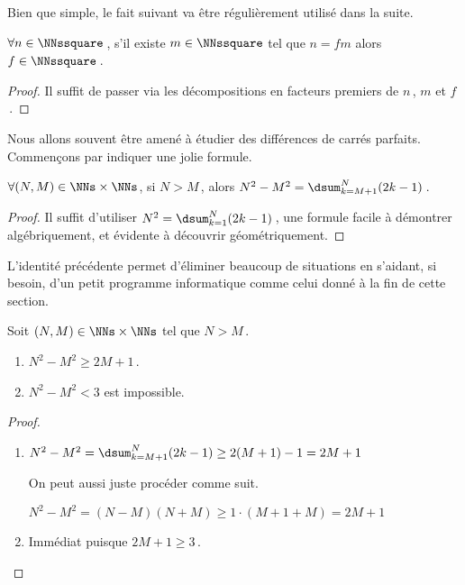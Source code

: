 

Bien que simple, le fait suivant va être régulièrement utilisé dans la suite.


\begin{fact} \label{facto-square}
	$\forall n \in \NNssquare$\,, s'il existe $m \in \NNssquare$ tel que $n =  f m$ alors $f  \in \NNssquare$\,.
\end{fact}


\begin{proof}
	Il suffit de passer via les décompositions en facteurs premiers de $n$\,, $m$ et $f$\,.
\end{proof}




Nous allons souvent être amené à étudier des différences de carrés parfaits.
Commençons par indiquer une jolie formule.

\begin{fact} \label{dist-square}
	$\forall (N, M) \in \NNs \times \NNs$, 
	si $N > M$\,, alors $N^2 - M^2 = \dsum_{k=M+1}^{N} (2 k - 1)$\,.
\end{fact}


\begin{proof}
	Il suffit d'utiliser $N^2 = \dsum_{k=1}^{N} (2 k - 1)$\,, une formule facile à démontrer algébriquement, et évidente à découvrir géométriquement.
\end{proof}




L'identité précédente permet d'éliminer beaucoup de situations en s'aidant, si besoin, d'un petit programme informatique comme celui donné à la fin de cette section.

\begin{fact} \label{diff-square-ko}
	Soit $(N, M) \in \NNs \times \NNs$ tel que $N > M$\,.
	\begin{enumerate}
		\item $N^2 - M^2 \geq 2M + 1$\,.
		
		\item $N^2 - M^2 < 3$ est impossible.
	\end{enumerate}
\end{fact}


\begin{proof}
	\leavevmode
	
	\begin{enumerate}
		\item $N^2 - M^2 = \dsum_{k=M+1}^{N} (2 k - 1) \geq 2(M + 1) - 1 = 2M + 1$
		
		\smallskip
		\noindent
		On peut aussi juste procéder comme suit. 
		
		\smallskip
		\noindent
		$N^2 - M^2 = (N - M)(N + M) \geq 1 \cdot (M + 1 + M) = 2M + 1$



		\item Immédiat puisque $2M + 1 \geq 3$\,.
	\end{enumerate}

\end{proof}


